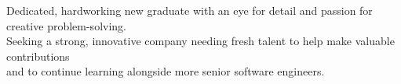 \documentclass{/Users/alexemrie/Documents/LaTeX/res/res}
\begin{document}





                                        

\begin{resume}

	\begin{center}
	\begin{varwidth}[t]{\textwidth}
	\raggedright
	
	Dedicated, hardworking new graduate with an eye for detail and passion for creative problem-solving. \\
	Seeking a strong, innovative company needing fresh talent to help make valuable contributions \\
	and to continue learning alongside more senior software engineers.
	
	\end{varwidth}	
	\end{center}

\vspace{0.2in} 

\raggedright
\begin{parcolumns}{2}


\colplacechunks
{}
\end{parcolumns}
  

\end{resume}
\end{document}
